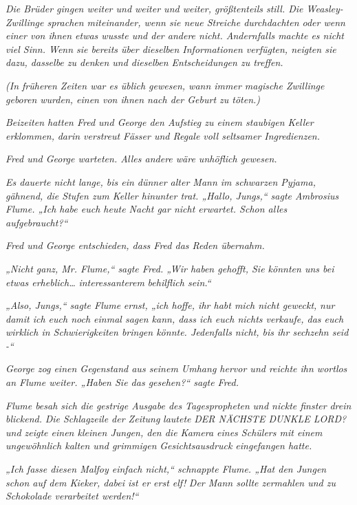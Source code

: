 {\emph{Die Brüder gingen weiter und weiter und weiter, größtenteils still. Die Weasley-Zwillinge sprachen miteinander, wenn sie neue Streiche durchdachten oder wenn einer von ihnen etwas wusste und der andere nicht. Andernfalls machte es nicht viel Sinn. Wenn sie bereits über dieselben Informationen verfügten, neigten sie dazu, dasselbe zu denken und dieselben Entscheidungen zu treffen.}

\emph{(In früheren Zeiten war es üblich gewesen, wann immer magische Zwillinge geboren wurden, einen von ihnen nach der Geburt zu töten.)}

\emph{Beizeiten hatten Fred und George den Aufstieg zu einem staubigen Keller erklommen,} \emph{darin verstreut Fässer und Regale voll seltsamer Ingredienzen.}

\emph{Fred und George warteten. Alles andere wäre unhöflich gewesen.}

\emph{Es dauerte nicht lange, bis ein dünner alter Mann im schwarzen Pyjama, gähnend, die Stufen zum Keller hinunter trat. „Hallo, Jungs,“ sagte Ambrosius Flume. „Ich habe euch heute Nacht gar nicht erwartet. Schon alles aufgebraucht?“}

\emph{Fred und George entschieden, dass Fred das Reden übernahm.}

\emph{„Nicht ganz, Mr. Flume,“ sagte Fred. „Wir haben gehofft, Sie könnten uns bei etwas erheblich…} \emph{\emph{interessanterem}} \emph{behilflich sein.“}

\emph{„Also, Jungs,“ sagte Flume} \emph{ernst, „ich hoffe, ihr habt mich nicht geweckt,} \emph{nur damit ich euch noch einmal sagen kann, dass ich euch nichts verkaufe, das euch wirklich in Schwierigkeiten bringen könnte. Jedenfalls nicht, bis ihr sechzehn seid -“}

\emph{George zog einen Gegenstand aus seinem Umhang hervor und reichte ihn wortlos an Flume weiter. „Haben Sie das gesehen?“ sagte Fred.}

\emph{Flume besah sich die gestrige Ausgabe des} \emph{\emph{Tagespropheten}} \emph{und nickte finster} \emph{drein blickend.} \emph{Die Schlagzeile der Zeitung} \emph{lautete} \emph{DER NÄCHSTE DUNKLE LORD? und zeigte einen kleinen Jungen, den die Kamera eines Schülers mit einem ungewöhnlich kalten und grimmigen} \emph{Gesichtsausdruck eingefangen hatte.}

\emph{„Ich fasse diesen Malfoy einfach nicht,“ schnappte Flume. „Hat den Jungen schon auf dem Kieker, dabei ist er erst elf!} \emph{Der Mann sollte zermahlen und zu Schokolade verarbeitet werden!“}

}
